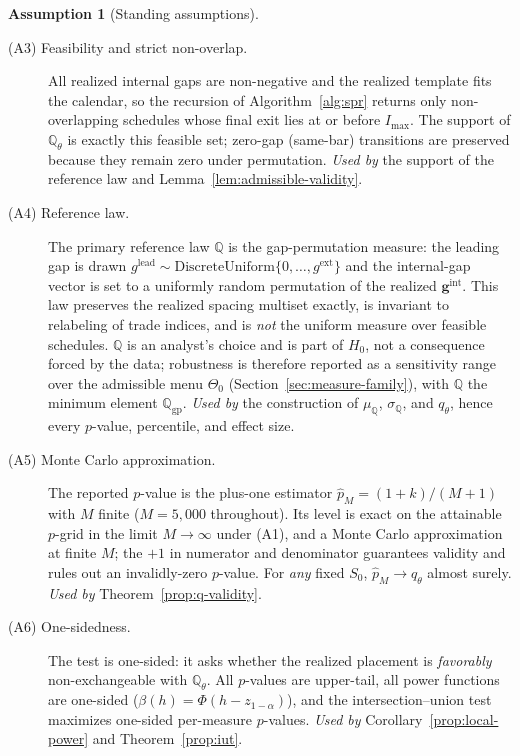 \documentclass[preprint,12pt]{elsarticle}
\theoremstyle{definition}
\newtheorem{assumption}{Assumption}
\begin{document}
\begin{assumption}[Standing assumptions]
\begin{description}
\item[(A3) Feasibility and strict non-overlap.] All realized internal gaps
are non-negative and the realized template fits the calendar, so the recursion
of Algorithm~\ref{alg:spr} returns only non-overlapping schedules whose final
exit lies at or before $I_{\max}$. The support of $\mathbb{Q}_\theta$ is exactly
this feasible set; zero-gap (same-bar) transitions are preserved because they
remain zero under permutation. \emph{Used by} the support of the reference law
and Lemma~\ref{lem:admissible-validity}.

\item[(A4) Reference law.] The primary reference law $\mathbb{Q}$ is the
gap-permutation measure: the leading gap is drawn
$g^{\mathrm{lead}}\sim\mathrm{DiscreteUniform}\{0,\dots,g^{\mathrm{ext}}\}$ and
the internal-gap vector is set to a uniformly random permutation of the
realized $\mathbf g^{\mathrm{int}}$. This law preserves the realized spacing
multiset exactly, is invariant to relabeling of trade indices, and is
\emph{not} the uniform measure over feasible schedules. $\mathbb{Q}$ is an
analyst's choice and is part of $H_0$, not a consequence forced by the data;
robustness is therefore reported as a sensitivity range over the admissible
menu $\Theta_0$ (Section~\ref{sec:measure-family}), with $\mathbb{Q}$ the
minimum element $\mathbb{Q}_{\mathrm{gp}}$. \emph{Used by} the construction of
$\mu_{\mathbb Q}$, $\sigma_{\mathbb Q}$, and $q_\theta$, hence every $p$-value,
percentile, and effect size.

\item[(A5) Monte Carlo approximation.] The reported $p$-value is the plus-one
estimator $\hat p_M=(1+k)/(M+1)$ with $M$ finite ($M=5{,}000$ throughout). Its
level is exact on the attainable $p$-grid in the limit $M\to\infty$ under (A1),
and a Monte Carlo approximation at finite $M$; the $+1$ in numerator and
denominator guarantees validity and rules out an invalidly-zero $p$-value. For
\emph{any} fixed $S_0$, $\hat p_M\to q_\theta$ almost surely. \emph{Used by}
Theorem~\ref{prop:q-validity}.

\item[(A6) One-sidedness.] The test is one-sided: it asks whether the realized
placement is \emph{favorably} non-exchangeable with $\mathbb{Q}_\theta$. All
$p$-values are upper-tail, all power functions are one-sided
($\beta(h)=\Phi(h-z_{1-\alpha})$), and the intersection--union test maximizes
one-sided per-measure $p$-values. \emph{Used by} Corollary~\ref{prop:local-power}
and Theorem~\ref{prop:iut}.


\end{description}
\end{assumption}
\end{document}
